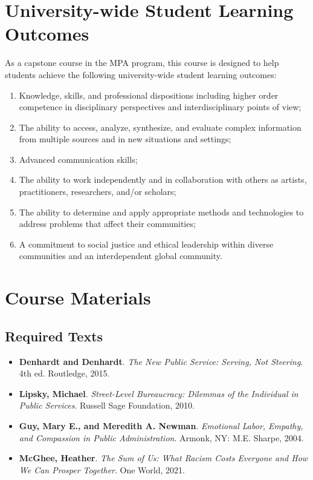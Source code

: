 \documentclass[12pt, letterpaper]{article}
\begin{document}
\section{University-wide Student Learning Outcomes}
    As a capstone course in the MPA program, this course is designed to help students achieve the following university-wide student learning outcomes:
    \begin{enumerate}
        \item Knowledge, skills, and professional dispositions including higher order competence in disciplinary perspectives and interdisciplinary points of view;
        \item The ability to access, analyze, synthesize, and evaluate complex information from multiple sources and in new situations and settings;
        \item Advanced communication skills;
        \item The ability to work independently and in collaboration with others as artists, practitioners, researchers, and/or scholars;
        \item The ability to determine and apply appropriate methods and technologies to address problems that affect their communities; 
        \item A commitment to social justice and ethical leadership within diverse communities and an interdependent global community.
    \end{enumerate}

    \section{Course Materials}
    \subsection*{Required Texts}
    \begin{itemize}
        \item \textbf{Denhardt and Denhardt}. \textit{The New Public Service: Serving, Not Steering}. 4th ed. Routledge, 2015.
        \item \textbf{Lipsky, Michael}. \textit{Street-Level Bureaucracy: Dilemmas of the Individual in Public Services}. Russell Sage Foundation, 2010.
        \item \textbf{Guy, Mary E., and Meredith A. Newman}. \textit{Emotional Labor, Empathy, and Compassion in Public Administration}. Armonk, NY: M.E. Sharpe, 2004.
        \item \textbf{McGhee, Heather}. \textit{The Sum of Us: What Racism Costs Everyone and How We Can Prosper Together}. One World, 2021.
    \end{itemize}
\end{document}
